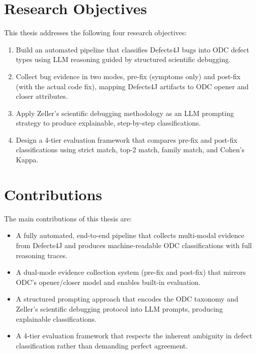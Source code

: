 \documentclass{iutbscthesis}
\begin{document}
\section{Research Objectives}

This thesis addresses the following four research objectives:

\begin{enumerate}
    \item[\textbf{RO-1:}] Build an automated pipeline that classifies Defects4J bugs into ODC defect types using LLM reasoning guided by structured scientific debugging.
    \item[\textbf{RO-2:}] Collect bug evidence in two modes, pre-fix (symptoms only) and post-fix (with the actual code fix), mapping Defects4J artifacts to ODC opener and closer attributes.
    \item[\textbf{RO-3:}] Apply Zeller's scientific debugging methodology as an LLM prompting strategy to produce explainable, step-by-step classifications.
    \item[\textbf{RO-4:}] Design a 4-tier evaluation framework that compares pre-fix and post-fix classifications using strict match, top-2 match, family match, and Cohen's Kappa.
\end{enumerate}

\section{Contributions}

The main contributions of this thesis are:

\begin{itemize}
    \item A fully automated, end-to-end pipeline that collects multi-modal evidence from Defects4J and produces machine-readable ODC classifications with full reasoning traces.
    \item A dual-mode evidence collection system (pre-fix and post-fix) that mirrors ODC's opener/closer model and enables built-in evaluation.
    \item A structured prompting approach that encodes the ODC taxonomy and Zeller's scientific debugging protocol into LLM prompts, producing explainable classifications.
    \item A 4-tier evaluation framework that respects the inherent ambiguity in defect classification rather than demanding perfect agreement.
\end{itemize}
\end{document}
